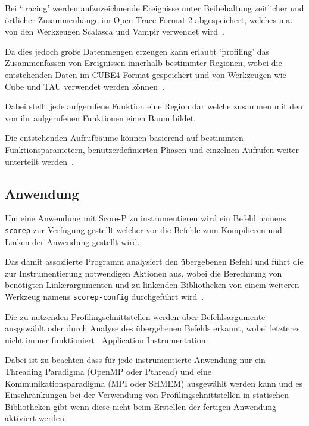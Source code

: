 \documentclass[german,proseminar,hyperref,utf8,lof]{zihpub}
\begin{document}
    Bei `tracing' werden aufzuzeichnende Ereignisse unter Beibehaltung zeitlicher und örtlicher
    Zusammenhänge im Open Trace Format 2 abgespeichert, welches u.a. von den Werkzeugen Scalasca
    und Vampir verwendet wird~.

    Da dies jedoch gro{\ss}e Datenmengen erzeugen kann erlaubt `profiling' das Zusammenfassen von
    Ereignissen innerhalb bestimmter Regionen, wobei die entstehenden Daten im CUBE4 Format
    gespeichert und von Werkzeugen wie Cube und TAU verwendet werden
    können~.

    Dabei stellt jede aufgerufene Funktion eine Region dar welche zusammen mit den von ihr
    aufgerufenen Funktionen einen Baum bildet.

    Die entstehenden Aufrufbäume können basierend auf bestimmten Funktionsparametern,
    benutzerdefinierten Phasen und einzelnen Aufrufen weiter unterteilt
    werden~.

    \subsection{Anwendung}
    Um eine Anwendung mit Score-P zu instrumentieren wird ein Befehl namens \texttt{scorep} zur Verfügung
    gestellt welcher vor die Befehle zum Kompilieren und Linken der Anwendung gestellt wird.

    Das damit assoziierte Programm analysiert den übergebenen Befehl und führt die zur Instrumentierung
    notwendigen Aktionen aus, wobei die Berechnung von benötigten Linkerargumenten und zu linkenden
    Bibliotheken von einem weiteren Werkzeug namens \texttt{scorep-config} durchgeführt
    wird~.

    Die zu nutzenden Profilingschnittstellen werden über Befehlsargumente ausgewählt oder durch
    Analyse des übergebenen Befehls erkannt, wobei letzteres nicht immer funktioniert~
    {Application Instrumentation}.

    Dabei ist zu beachten dass für jede instrumentierte Anwendung nur ein Threading Paradigma
    (OpenMP oder Pthread) und eine Kommunikationsparadigma (MPI oder SHMEM) ausgewählt werden kann
    und es Einschränkungen bei der Verwendung von Profilingschnittstellen in statischen
    Bibliotheken gibt wenn diese nicht beim Erstellen der fertigen Anwendung aktiviert werden.
\end{document}
